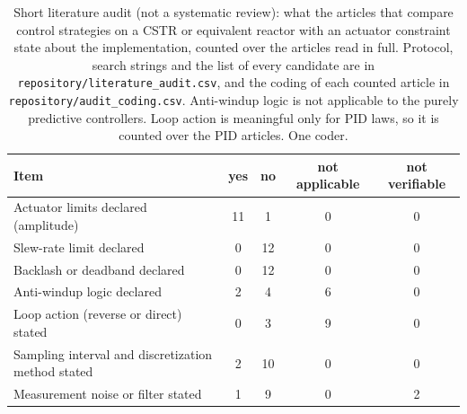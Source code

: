 \begin{table}[t]
\centering
\footnotesize
\setlength{\tabcolsep}{3pt}
\caption{Short literature audit (not a systematic review): what the articles that compare control strategies on a CSTR or equivalent reactor with an actuator constraint state about the implementation, counted over the articles read in full. Protocol, search strings and the list of every candidate are in \texttt{repository/literature\_audit.csv}, and the coding of each counted article in \texttt{repository/audit\_coding.csv}. Anti-windup logic is not applicable to the purely predictive controllers. Loop action is meaningful only for PID laws, so it is counted over the PID articles. One coder.}
\label{tab:literature_audit}
\begin{tabular}{lcccc}
\toprule
Item & yes & no & not applicable & not verifiable \\
\midrule
Actuator limits declared (amplitude) & 11 & 1 & 0 & 0 \\
Slew-rate limit declared & 0 & 12 & 0 & 0 \\
Backlash or deadband declared & 0 & 12 & 0 & 0 \\
Anti-windup logic declared & 2 & 4 & 6 & 0 \\
Loop action (reverse or direct) stated & 0 & 3 & 9 & 0 \\
Sampling interval and discretization method stated & 2 & 10 & 0 & 0 \\
Measurement noise or filter stated & 1 & 9 & 0 & 2 \\
\bottomrule
\end{tabular}
\end{table}
